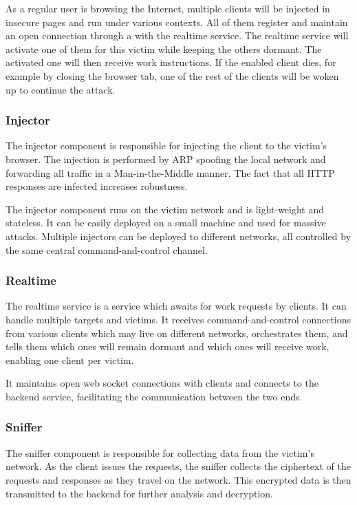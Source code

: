 \documentclass[conference, letterpaper, 10pt]{IEEEtran}
\begin{document}
As a regular user is browsing the Internet, multiple clients will be
injected in insecure pages and run under various contexts. All of
them register and maintain an open connection through a
with the realtime service. The realtime
service will activate one of them for this victim while keeping the others
dormant. The activated one will then receive work instructions. If the enabled
client dies, for example by closing the browser
tab, one of the rest of the clients will be woken up to continue the
attack.

\subsubsection{Injector}

The injector component is responsible for injecting the client to the victim's
browser. The injection is performed by ARP spoofing the local
network and forwarding all traffic in a Man-in-the-Middle manner. The fact that all HTTP
responses are infected increases robustness.

The injector component runs on the victim network and is
light-weight and stateless. It can be easily deployed on a small machine and
used for massive attacks. Multiple injectors can be deployed to different
networks, all controlled by the same central command-and-control channel.

\subsubsection{Realtime}

The realtime service is a service which awaits for work requests by clients. It
can handle multiple targets and victims. It receives command-and-control
connections from various clients which may live on different networks,
orchestrates them, and tells them which ones will remain dormant and which ones
will receive work, enabling one client per victim.

It maintains open web socket connections with clients and
connects to the backend service, facilitating the communication between the two
ends.

\subsubsection{Sniffer}

The sniffer component is responsible for collecting data from the
victim's network. As the client issues the requests, the sniffer
collects the ciphertext of the requests and responses as they
travel on the network. This encrypted data is then transmitted to the backend
for further analysis and decryption.
\end{document}
